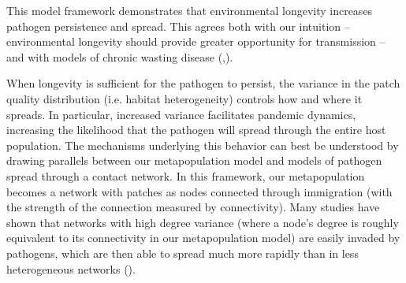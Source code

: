 \documentclass{svjour3}
\begin{document}
This model framework demonstrates that environmental longevity increases pathogen persistence and spread.  This agrees both with our intuition -- environmental longevity should provide greater opportunity for transmission -- and with models of chronic wasting disease (\cite{Almberg2011},\cite{Sharp2011}).  

When longevity is sufficient for the pathogen to persist, the variance in the patch quality distribution (i.e. habitat heterogeneity) controls how and where it spreads.  In particular, increased variance facilitates pandemic dynamics, increasing the likelihood that the pathogen will spread through the entire host population.  The mechanisms underlying this behavior can best be understood by drawing parallels between our metapopulation model and models of pathogen spread through a contact network.  In this framework, our metapopulation becomes a network with patches as nodes connected through immigration (with the strength of the connection measured by connectivity).  Many studies have shown that networks with high degree variance (where a node's degree is roughly equivalent to its connectivity in our metapopulation model) are easily invaded by pathogens, which are then able to spread much more rapidly than in less heterogeneous networks (\cite{Pastor-Satorras2001}).
\end{document}
